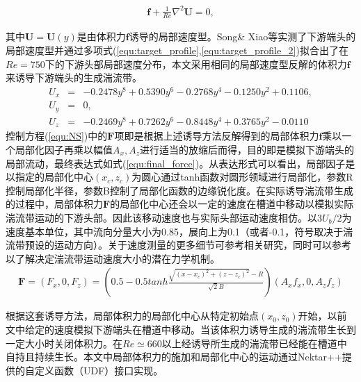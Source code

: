\begin{equation}\label{force}
\begin{aligned}
\boldsymbol{f} + \frac{1}{Re}\nabla^{2}\boldsymbol{U} = 0 ,
\end{aligned}
\end{equation}

其中$\bm U = \bm U(y)$是由体积力$\bm f$诱导的局部速度型。Song\& Xiao等实测了下游端头的局部速度型\cite{Song2020}并通过多项式(\ref{equ:target_profile},\ref{equ:target_profile_2})拟合出了\cite{Xiao2020}在$Re = 750$下的下游头部局部速度分布，本文采用相同的局部速度型反解的体积力$\boldsymbol{f}$来诱导下游端头的生成湍流带。
\begin{eqnarray}
\label{equ:target_profile}
U_x&=&-0.2478y^8 + 0.5390y^6 -0.2768y^4-0.1250y^2+0.1106,\\
U_y&=&0, \\
\label{equ:target_profile_2}
U_z&=&-0.2469y^8 + 0.7262y^6 -0.8448y^4+0.3765y^2-0.0110
\end{eqnarray}
控制方程(\ref{equ:NS})中的$\bm F$项即是根据上述诱导方法反解得到的局部体积力$\bm f$乘以一个局部化因子再乘以幅值$A_x,A_z$进行适当的放缩后而得，目的即是模拟下游端头的局部流动，最终表达式如式(\ref{equ:final_force})。从表达形式可以看出，局部因子是以指定的局部化中心$(x_c,z_c)$为圆心通过tanh函数对圆形领域进行局部化，参数R控制局部化半径，参数B控制了局部化函数的边缘锐化度。在实际诱导湍流带生成的过程中，局部体积力$\bm F$的局部化中心还会以一定的速度在槽道中移动以模拟实际湍流带运动的下游头部。因此该移动速度也与实际头部运动速度相仿。以$3U_b/2$为速度基本单位，其中流向分量大小为0.85，展向上为0.1（或者-0.1，符号取决于湍流带预设的运动方向）\cite{Xiao2020b}。关于速度测量的更多细节可参考相关研究\cite{Paranjape2019, Xiao2020, Song2020, Xiao2020b, Liu2020}，同时可以参考\cite{Xiao2020,Xiao2020c}以了解决定湍流带运动速度大小的潜在力学机制。
\begin{eqnarray}
\label{equ:final_force}
\bm F = (F_x,0,F_z) = (0.5 - 0.5tanh\frac{\sqrt{(x-x_c)^2+(z-z_c)^2}-R}{\sqrt{2}B})(A_xf_x,0,A_zf_z)
\end{eqnarray}

根据这套诱导方法，局部体积力的局部化中心从特定初始点$(x_0, z_0)$开始，以前文中给定的速度模拟下游端头在槽道中移动。当该体积力诱导生成的湍流带生长到一定大小时关闭体积力。在$Re\simeq 660$以上经诱导所生成的湍流带已经能在槽道中自持且持续生长\cite{Kanazawa2018, Tao2018, Paranjape2019}。本文中局部体积力的施加和局部化中心的运动通过Nektar++提供的自定义函数（UDF）接口实现。

